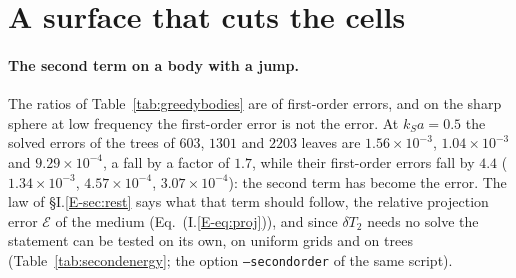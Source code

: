 \documentclass[11pt,a4paper]{article}
\newcommand{\cE}{\mathcal{E}}
\begin{document}
\section{A surface that cuts the cells}\label{sec:jump}

\paragraph{The second term on a body with a jump.} The ratios of Table~\ref{tab:greedybodies} are of
first-order errors, and on the sharp sphere at low frequency the first-order error is not the error. At
$k_Sa=0.5$ the solved errors of the trees of $603$, $1301$ and $2203$ leaves are $1.56\times10^{-3}$,
$1.04\times10^{-3}$ and $9.29\times10^{-4}$, a fall by a factor of $1.7$, while their first-order errors
fall by $4.4$ ($1.34\times10^{-3}$, $4.57\times10^{-4}$, $3.07\times10^{-4}$): the second term has become
the error. The law of \S I.\ref{E-sec:rest} says what that term should follow, the relative projection error
$\cE$ of the medium (Eq.~(I.\ref{E-eq:proj})), and since $\delta T_2$ needs no solve the statement can be
tested on its own, on uniform grids and on trees (Table~\ref{tab:secondenergy}; the option
\texttt{--secondorder} of the same script).
\end{document}
